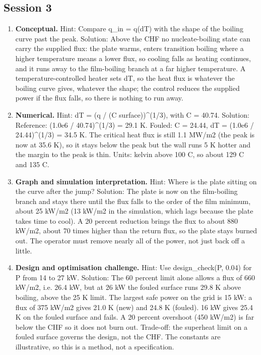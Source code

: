 \documentclass[11pt,a4paper]{article}
\begin{document}
\subsection*{Session 3}
\begin{enumerate}[nosep]
\item \textbf{Conceptual.} Hint: Compare q\_in = q(dT) with the shape of the boiling curve past the peak. Solution: Above the CHF no nucleate-boiling state can carry the supplied flux: the plate warms, enters transition boiling where a higher temperature means a lower flux, so cooling falls as heating continues, and it runs away to the film-boiling branch at a far higher temperature. A temperature-controlled heater sets dT, so the heat flux is whatever the boiling curve gives, whatever the shape; the control reduces the supplied power if the flux falls, so there is nothing to run away.
\item \textbf{Numerical.} Hint: dT = (q / (C surface))\textasciicircum{}(1/3), with C = 40.74. Solution: Reference: (1.0e6 / 40.74)\textasciicircum{}(1/3) = 29.1 K. Fouled: C = 24.44, dT = (1.0e6 / 24.44)\textasciicircum{}(1/3) = 34.5 K. The critical heat flux is still 1.1 MW/m2 (the peak is now at 35.6 K), so it stays below the peak but the wall runs 5 K hotter and the margin to the peak is thin. Units: kelvin above 100 C, so about 129 C and 135 C.
\item \textbf{Graph and simulation interpretation.} Hint: Where is the plate sitting on the curve after the jump? Solution: The plate is now on the film-boiling branch and stays there until the flux falls to the order of the film minimum, about 25 kW/m2 (13 kW/m2 in the simulation, which lags because the plate takes time to cool). A 20 percent reduction brings the flux to about 880 kW/m2, about 70 times higher than the return flux, so the plate stays burned out. The operator must remove nearly all of the power, not just back off a little.
\item \textbf{Design and optimisation challenge.} Hint: Use design\_check(P, 0.04) for P from 14 to 27 kW. Solution: The 60 percent limit alone allows a flux of 660 kW/m2, i.e. 26.4 kW, but at 26 kW the fouled surface runs 29.8 K above boiling, above the 25 K limit. The largest safe power on the grid is 15 kW: a flux of 375 kW/m2 gives 21.0 K (new) and 24.8 K (fouled). 16 kW gives 25.4 K on the fouled surface and fails. A 20 percent overshoot (450 kW/m2) is far below the CHF so it does not burn out. Trade-off: the superheat limit on a fouled surface governs the design, not the CHF. The constants are illustrative, so this is a method, not a specification.
\end{enumerate}
\end{document}
